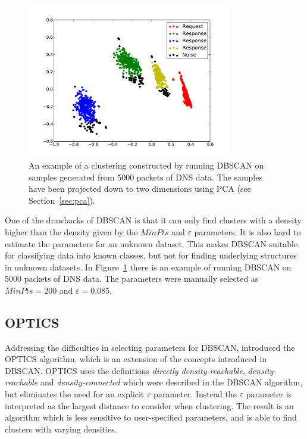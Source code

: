 \documentclass[a4paper]{report}
\begin{document}
\begin{figure}[h]
    \centering
    \includegraphics[width=0.8\textwidth]{img/dbscan_dns}
    \captionsetup{width=0.8\textwidth}
    \caption{An example of a clustering constructed by running DBSCAN on
    samples generated from 5000 packets of DNS data. The samples have been
    projected down to two dimensions using PCA (see Section~\ref{sec:pca}).}
    \label{fig:dbscan}
\end{figure}

One of the drawbacks of DBSCAN is that it can only find clusters with a density
higher than the density given by the $MinPts$ and $\varepsilon$ parameters.
It is also hard to estimate the parameters for an unknown dataset. This makes
DBSCAN suitable for classifying data into known classes, but not for finding
underlying structures in unknown datasets. In Figure~\ref{fig:dbscan} there is
an example of running DBSCAN on 5000 packets of DNS data. The parameters were
manually selected as $MinPts = 200$ and $\varepsilon = 0.085$.

\subsection{OPTICS}
Addressing the difficulties in selecting parameters for DBSCAN,
\citet{ankerst99} introduced the OPTICS algorithm, which is an extension of
the concepts introduced in DBSCAN. OPTICS uses the definitions
\emph{directly density-reachable}, \emph{density-reachable} and
\emph{density-connected} which were described in the DBSCAN algorithm, but
eliminates the need for an explicit $\varepsilon$ parameter. Instead the
$\varepsilon$ parameter is interpreted as the largest distance to consider
when clustering. The result is an algorithm which is less sensitive to
user-specified parameters, and is able to find clusters with varying densities.
\end{document}
